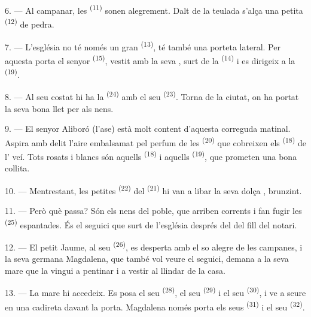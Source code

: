 6. --- Al campanar, les  \textsuperscript{(11)} sonen alegrement. Dalt de la
teulada s'alça una petita  \textsuperscript{(12)} de pedra.

7. --- L'església no té només un gran  \textsuperscript{(13)}, té també una
porteta lateral. Per aquesta porta el senyor  \textsuperscript{(15)}, vestit
amb la seva , surt de la
 \textsuperscript{(14)} i es dirigeix a la 
\textsuperscript{(19)}.

8. --- Al seu costat hi ha la  \textsuperscript{(24)} amb el seu
 \textsuperscript{(23)}. Torna de la ciutat, on ha portat la seva bona
llet per als nens.

\VUsaut{4.0mm}
\VUsaut{3.4mm}

9. --- El senyor Aliboró (l'ase) està molt content d'aquesta correguda matinal. Aspira amb
delit l'aire embalsamat pel perfum de les  \textsuperscript{(20)} que cobreixen
els  \textsuperscript{(18)} de l' veí. Tots rosats i
blancs són aquells
 \textsuperscript{(18)} i aquells 
\textsuperscript{(19)}, que prometen una bona collita.

10. --- Mentrestant, les petites  \textsuperscript{(22)} del
 \textsuperscript{(21)} hi van a libar la seva dolça ,
brunzint.

11. --- Però què passa? Són els nens del poble, que arriben corrents i fan fugir les
 \textsuperscript{(25)} espantades. És el seguici que surt de l'església després
del  del fill del notari.

12. --- El petit Jaume, al seu  \textsuperscript{(26)}, es desperta amb el so
alegre de les campanes, i la seva germana Magdalena, que també vol veure el seguici, demana a
la seva mare que la vingui a pentinar i a vestir al llindar de la casa.

13. --- La mare hi accedeix. Es posa el seu  \textsuperscript{(28)}, el
seu  \textsuperscript{(29)} i el seu
 \textsuperscript{(30)}, i ve a seure en una cadireta davant la
porta. Magdalena només porta els seus  \textsuperscript{(31)} i el seu
 \textsuperscript{(32)}.


